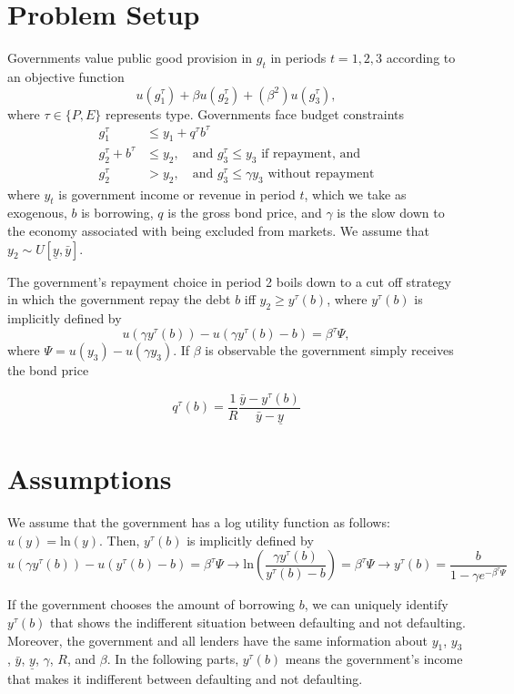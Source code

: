 \documentclass{article}
\begin{document}
\section{Problem Setup}

Governments value public good provision in $g_t$ in periods $t = 1,2,3$ according to an objective function
\[
u(g_1^\tau) + \beta u(g_2^\tau) + (\beta^2) u(g_3^\tau),
\]
where $\tau \in \{P, E\}$ represents type. Governments face budget constraints
\[
\begin{aligned}
g_1^\tau &\leq y_1 + q^\tau b^\tau \\
g_2^\tau + b^\tau &\leq y_2, \quad \text{and } g_3^\tau \leq y_3 \text{ if repayment, and} \\
g_2^\tau &> y_2, \quad \text{and } g_3^\tau \leq \gamma y_3 \text{ without repayment}
\end{aligned}
\]
where $y_t$ is government income or revenue in period $t$, which we take as exogenous, $b$ is borrowing, $q$ is the gross bond price, and $\gamma$ is the slow down to the economy associated with being excluded from markets. We assume that $y_2 \sim U[\underline{y}, \bar{y}]$.

The government's repayment choice in period 2 boils down to a cut off strategy in which the government repay the debt $b$ iff $y_2 \geq y^\tau(b)$, where $y^\tau(b)$ is implicitly defined by
\[
u(\gamma y^\tau(b)) - u(\gamma y^\tau(b) - b) = \beta^\tau \Psi,
\]
where $\Psi = u(y_3) - u(\gamma y_3)$. If $\beta$ is observable the government simply receives the bond price

$$ q^\tau(b) =\frac{1}{R} \frac{\bar{y} - y^\tau(b)}{\bar{y} - \underline{y}} 
$$ 

\section{Assumptions}

We assume that the government has a log utility function as follows: $u(y) = \text{ln}(y)$. Then, $y^\tau(b)$ is implicitly defined by
$$
u(\gamma y^\tau(b)) - u(y^\tau(b) - b) = \beta^\tau \Psi \rightarrow \text{ln}(\frac{\gamma y^\tau(b)}{y^\tau(b) - b}) = \beta^\tau \Psi \rightarrow  y^\tau(b) = \frac{b}{1 - \gamma e^{- \beta^\tau \Psi}}
$$

If the government chooses the amount of borrowing $b$, we can uniquely identify $y^\tau(b)$ that shows the indifferent situation between defaulting and not defaulting. 
Moreover, the government and all lenders have the same information about $y_1$, $y_3$, $\bar{y}$, $\underline{y}$, $\gamma$, $R$, and $\beta$. In the following parts, $y^\tau(b)$ means the government's income that makes it indifferent between defaulting and not defaulting. 
\end{document}
